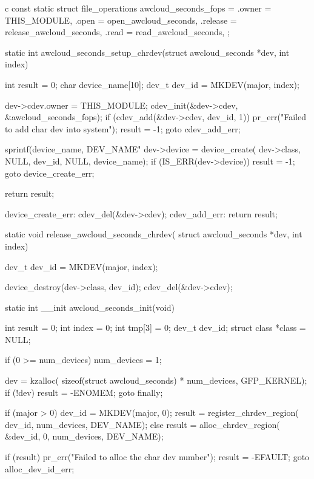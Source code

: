 \begin{code-block}{c}
const static struct file_operations awcloud_seconds_fops = {
        .owner          = THIS_MODULE,
        .open           = open_awcloud_seconds,
        .release        = release_awcloud_seconds,
        .read           = read_awcloud_seconds,
};

static int awcloud_seconds_setup_chrdev(struct awcloud_seconds *dev, int index)
{
        int result = 0;
        char device_name[10];
        dev_t dev_id = MKDEV(major, index);

        dev->cdev.owner = THIS_MODULE;
        cdev_init(&dev->cdev, &awcloud_seconds_fops);
        if (cdev_add(&dev->cdev, dev_id, 1)) {
                pr_err("Failed to add char dev into system\n");
                result = -1;
                goto cdev_add_err;
        }

        sprintf(device_name, DEV_NAME"%
        dev->device = device_create(
                dev->class, NULL, dev_id, NULL, device_name);
        if (IS_ERR(dev->device)) {
                result = -1;
                goto device_create_err;
        }

        return result;

device_create_err:
        cdev_del(&dev->cdev);
cdev_add_err:
        return result;
}

static void release_awcloud_seconds_chrdev(
        struct awcloud_seconds *dev, int index)
{
        dev_t dev_id = MKDEV(major, index);

        device_destroy(dev->class, dev_id);
        cdev_del(&dev->cdev);
}

static int __init awcloud_seconds_init(void)
{
        int result = 0;
        int index = 0;
        int tmp[3] = {0};
        dev_t dev_id;
        struct class *class = NULL;

        if (0 >= num_devices) {
                num_devices = 1;
        }

        dev = kzalloc(
            sizeof(struct awcloud_seconds) * num_devices, GFP_KERNEL);
        if (!dev) {
                result = -ENOMEM;
                goto finally;
        }

        if (major > 0) {
                dev_id = MKDEV(major, 0);
                result = register_chrdev_region(
                        dev_id, num_devices, DEV_NAME);
        } else {
                result = alloc_chrdev_region(
                        &dev_id, 0, num_devices, DEV_NAME);
        }

        if (result) {
                pr_err("Failed to alloc the char dev number\n");
                result = -EFAULT;
                goto alloc_dev_id_err;
        }

}
\end{code-block}
